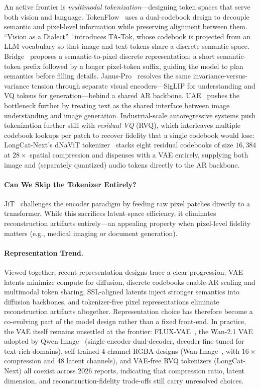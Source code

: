 An active frontier is \emph{multimodal tokenization}---designing token spaces that serve both vision and language. TokenFlow~\citep{qu2024tokenflow} uses a dual-codebook design to decouple semantic and pixel-level information while preserving alignment between them. ``Vision as a Dialect''~\citep{han2025vision} introduces TA-Tok, whose codebook is projected from an LLM vocabulary so that image and text tokens share a discrete semantic space. Bridge~\citep{wang2025bridge} proposes a semantic-to-pixel discrete representation: a short semantic-token prefix followed by a longer pixel-token suffix, guiding the model to plan semantics before filling details. Janus-Pro~\citep{chen2025janusprounifiedmultimodalunderstanding} resolves the same invariance-versus-variance tension through separate visual encoders---SigLIP for understanding and VQ tokens for generation---behind a shared AR backbone. UAE~\citep{yan2025uae} pushes the bottleneck further by treating text as the shared interface between image understanding and image generation. Industrial-scale autoregressive systems push tokenization further still with \emph{residual VQ} (RVQ), which interleaves multiple codebook lookups per patch to recover fidelity that a single codebook would lose: LongCat-Next's dNaViT tokenizer~\citep{team2026longcat} stacks eight residual codebooks of size $16{,}384$ at $28\times$ spatial compression and dispenses with a VAE entirely, supplying both image and (separately quantized) audio tokens directly to the AR backbone.

\paragraph{Can We Skip the Tokenizer Entirely?}
JiT~\citep{li2025back} challenges the encoder paradigm by feeding raw pixel patches directly to a transformer. While this sacrifices latent-space efficiency, it eliminates reconstruction artifacts entirely---an appealing property when pixel-level fidelity matters (e.g., medical imaging or document generation).

\paragraph{Representation Trend.}
Viewed together, recent representation designs trace a clear progression: VAE latents minimize compute for diffusion, discrete codebooks enable AR scaling and multimodal token sharing, SSL-aligned latents inject stronger semantics into diffusion backbones, and tokenizer-free pixel representations eliminate reconstruction artifacts altogether. Representation choice has therefore become a co-evolving part of the model design rather than a fixed front-end. In practice, the VAE itself remains unsettled at the frontier: FLUX-VAE~\citep{labs2025flux1kontextflowmatching}, the Wan-2.1 VAE adopted by Qwen-Image~\citep{wu2025qwen} (single-encoder dual-decoder, decoder fine-tuned for text-rich domains), self-trained 4-channel RGBA designs (Wan-Image~\citep{mao2026wan}, with $16\times$ compression and 48 latent channels), and VAE-free RVQ tokenizers (LongCat-Next) all coexist across 2026 reports, indicating that compression ratio, latent dimension, and reconstruction-fidelity trade-offs still carry unresolved choices.


